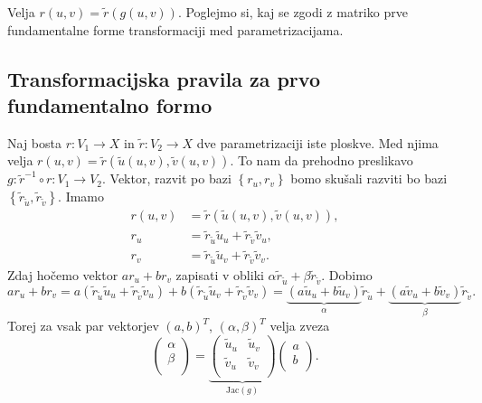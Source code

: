 Velja $r(u,v) = \tilde{r}(g(u,v))$. Poglejmo si, kaj se zgodi z matriko prve fundamentalne forme transformaciji med parametrizacijama.


\subsection{Transformacijska pravila za prvo fundamentalno formo}

Naj bosta $r: V_1 \to  X$ in $\tilde{r}: V_2 \to  X$ dve parametrizaciji iste ploskve. Med njima velja $r(u,v) = \tilde{r}(\tilde{u}(u,v), \tilde{v}(u,v))$.
To nam da prehodno preslikavo $g: \tilde{r}^{-1} \circ  r : V_1 \to  V_2$. Vektor, razvit po bazi $\left\{ r_u, r_v \right\}$ bomo skušali
razviti bo bazi $\left\{ \tilde{r}_{\tilde{u}}, \tilde{r}_{\tilde{v}} \right\}$. Imamo 
\begin{align*}
  r(u,v) &= \tilde{r}(\tilde{u}(u,v), \tilde{v}(u,v)), \\
  r_u   &= \tilde{r}_{\tilde{u}} \tilde{u}_u + \tilde{r}_{\tilde{v}} \tilde{v}_u, \\ 
  r_v &= \tilde{r}_{\tilde{u}} \tilde{u}_v + \tilde{r}_{\tilde{v}} \tilde{v}_v.
\end{align*}
Zdaj hočemo vektor $a r_u + b r_v$ zapisati v obliki $\alpha \tilde{r}_{\tilde{u}} + \beta \tilde{r}_\tilde{v}$. Dobimo 
\begin{equation*} a r_u + b r_v  = a(\tilde{r}_{\tilde{u}} \tilde{u}_u + \tilde{r}_{\tilde{v}} \tilde{v}_u) + b (\tilde{r}_{\tilde{u}} \tilde{u}_v + \tilde{r}_{\tilde{v}} \tilde{v}_v) 
= \underbrace{(a \tilde{u}_u + b \tilde{u}_v)}_{\alpha} \tilde{r}_{\tilde{u}} + \underbrace{(a \tilde{v}_u + b \tilde{v}_v)}_{\beta} \tilde{r}_{\tilde{v}}. \end{equation*}
Torej za vsak par vektorjev $(a, b)^{T}$, $(\alpha, \beta)^{T}$ velja zveza 
\begin{equation*} \begin{pmatrix}
  \alpha\\
  \beta\\
\end{pmatrix} = 
\underbrace{\begin{pmatrix}
  \tilde{u}_u & \tilde{u}_v\\
  \tilde{v}_u & \tilde{v}_v \\
\end{pmatrix}}_{\text{Jac}(g)}  
\begin{pmatrix}
  a\\
  b\\
\end{pmatrix}. \end{equation*}


